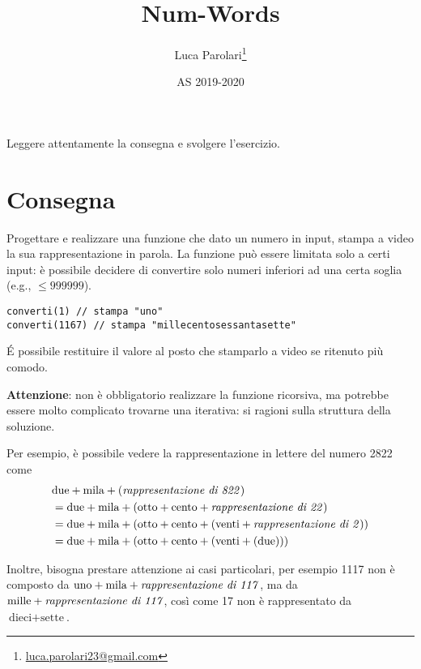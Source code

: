 \documentclass[addpoints,12pt,answers]{exam}
\author{Luca Parolari\footnote{\href{mailto:luca.parolari23@gmail.com}{luca.parolari23@gmail.com}}}
\begin{document}
\title{Num-Words}
\date{AS 2019-2020}

\maketitle

Leggere attentamente la consegna e svolgere l'esercizio.

\section{Consegna}

Progettare e realizzare una funzione che dato un numero in input,
stampa a video la sua rappresentazione in parola. La funzione può
essere limitata solo a certi input: è possibile decidere di convertire
solo numeri inferiori ad una certa soglia (e.g., $\leq 999999$).

\begin{lstlisting}[style=mycpp]
converti(1) // stampa "uno"
converti(1167) // stampa "millecentosessantasette"
\end{lstlisting}

\'E possibile restituire il valore al posto che stamparlo a video se ritenuto più comodo.

\textbf{Attenzione}: non è obbligatorio realizzare la funzione ricorsiva,
ma potrebbe essere molto complicato trovarne una iterativa: si ragioni
sulla struttura della soluzione.

Per esempio, è possibile vedere la rappresentazione in lettere del numero 2822 come
\begin{align*}
     & \text{due} + \text{mila} + (\text{\textit{rappresentazione di 822}})                                               \\
     & = \text{due} + \text{mila} + (\text{otto} + \text{cento} + \text{\textit{rappresentazione di 22}})                 \\
     & = \text{due} + \text{mila} + (\text{otto} + \text{cento} + (\text{venti} + \text{\textit{rappresentazione di 2}})) \\
     & = \text{due} + \text{mila} + (\text{otto} + \text{cento} + (\text{venti} + (\text{due})))
\end{align*}

Inoltre, bisogna prestare attenzione ai casi particolari, per esempio 1117 non è composto da
$\text{uno} + \text{mila} + \text{\textit{rappresentazione di 117}}$, ma da
$\text{mille} + \text{\textit{rappresentazione di 117}}$, così come 17 non è
rappresentato da $\text{dieci} + \text{sette}$.
\end{document}
